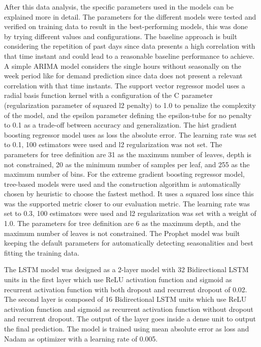 After this data analysis, the specific parameters used in the models can be explained more in detail.
The parameters for the different models were tested and verified on training data to result in the best-performing models, this was done by trying different values and configurations.
The baseline approach is built considering the repetition of past days since data presents a high correlation with that time instant and could lead to a reasonable baseline performance to achieve.
A simple ARIMA model considers the single hours without seasonally on the week period like for demand prediction since data does not present a relevant correlation with that time instants.
The support vector regressor model uses a radial basis function kernel with a configuration of the C parameter (regularization parameter of squared l2 penalty) to 1.0 to penalize the complexity of the model, and the epsilon parameter defining the epsilon-tube for no penalty to 0.1 as a trade-off between accuracy and generalization.
The hist gradient boosting regressor model uses as loss the absolute error.
The learning rate was set to 0.1, 100 estimators were used and l2 regularization was not set.
The parameters for tree definition are 31 as the maximum number of leaves, depth is not constrained, 20 as the minimum number of samples per leaf, and 255 as the maximum number of bins.
For the extreme gradient boosting regressor model, tree-based models were used and the construction algorithm is automatically chosen by heuristic to choose the fastest method.
It uses a squared loss since this was the supported metric closer to our evaluation metric.
The learning rate was set to 0.3, 100 estimators were used and l2 regularization was set with a weight of 1.0.
The parameters for tree definition are 6 as the maximum depth, and the maximum number of leaves is not constrained.
The Prophet model was built keeping the default parameters for automatically detecting seasonalities and best fitting the training data.

The LSTM model was designed as a 2-layer model with 32 Bidirectional LSTM units in the first layer which use ReLU activation function and sigmoid as recurrent activation function with both dropout and recurrent dropout of 0.02.
The second layer is composed of 16 Bidirectional LSTM units which use ReLU activation function and sigmoid as recurrent activation function without dropout and recurrent dropout.
The output of the layer goes inside a dense unit to output the final prediction.
The model is trained using mean absolute error as loss and Nadam as optimizer with a learning rate of 0.005.


